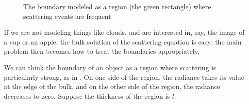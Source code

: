 \documentclass[hyperref, a4paper]{article}
\begin{document}
\begin{figure}
    \centering
    
    \caption{The boundary modeled as a region (the green rectangle) where scattering events are frequent}
    \label{fig:boundary-scattering}
\end{figure}

If we are not modeling things like clouds, 
and are interested in, say, the image of a cup or an apple, 
the bulk solution of the scattering equation is easy;
the main problem then becomes how to treat the boundaries appropriately.

We can think the boundary of an object as a region where 
scattering is particularly strong, 
as in .
On one side of the region, 
the radiance takes its value at the edge of the bulk, 
and on the other side of the region, 
the radiance decreases to zero. 
Suppose the thickness of the region is $l$.
\end{document}
